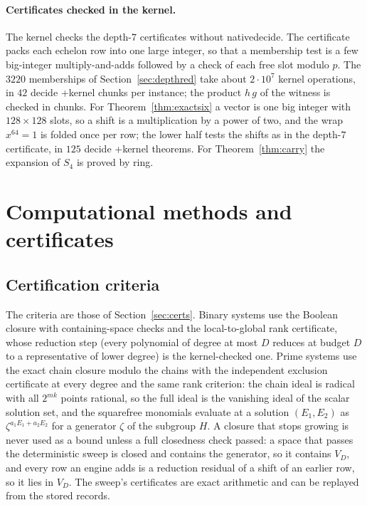 \documentclass[11pt]{article}
\theoremstyle{definition}\newtheorem{definition}[theorem]{Definition}
\theoremstyle{remark}\newtheorem{remark}[theorem]{Remark}
\newcommand{\codeus}{\textunderscore\allowbreak}
\newcommand{\code}[1]{{\ttfamily\let\_\codeus#1}}
\begin{document}
\paragraph{Certificates checked in the kernel.} The kernel checks the
depth-$7$ certificates without \code{native\_decide}. The certificate packs
each echelon row into one large integer, so that a membership test is a few
big-integer multiply-and-adds followed by a check of each free slot modulo
$p$. The $3220$ memberships of Section~\ref{sec:depthred} take about
$2\cdot10^7$ kernel operations, in $42$ \code{decide +kernel} chunks per
instance; the product $h\,g$ of the witness is checked in chunks. For Theorem~\ref{thm:exactsix} a vector is one big integer
with $128\times128$ slots, so a shift is a multiplication by a power of
two, and the wrap $x^{64}=1$ is folded once per row; the lower half tests
the shifts as in the depth-$7$ certificate, in $125$ \code{decide +kernel}
theorems. For Theorem~\ref{thm:carry}
the expansion of $S_4$ is proved by \code{ring}.

\section{Computational methods and certificates}\label{app:methods}

\subsection{Certification criteria}\label{app:certs}
The criteria are those of Section~\ref{sec:certs}. Binary systems use the
Boolean closure with containing-space checks and the local-to-global rank
certificate, whose reduction step (every polynomial of degree at most $D$
reduces at budget $D$ to a representative of lower degree) is the
kernel-checked one. Prime systems use the exact chain closure modulo the
chains with the independent exclusion certificate at every degree and the
same rank criterion: the chain ideal is radical with all $2^{mk}$ points
rational, so the full ideal is the vanishing ideal of the scalar solution
set, and the squarefree monomials evaluate at a solution $(E_1,E_2)$ as
$\zeta^{a_1E_1+a_2E_2}$ for a generator $\zeta$ of the subgroup $H$. A closure that stops
growing is never used as a bound unless a full closedness check passed: a
space that passes the deterministic sweep is closed and contains the
generator, so it contains $V_D$, and every row an engine adds is a
reduction residual of a shift of an earlier row, so it lies in $V_D$. The
sweep's certificates are exact arithmetic and can be replayed from the
stored records.
\end{document}
